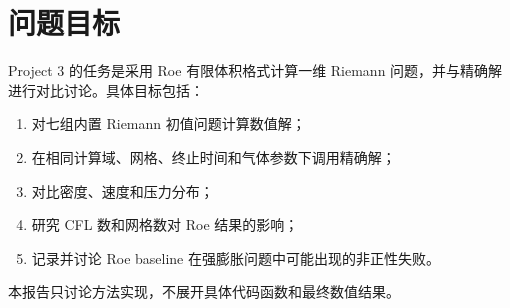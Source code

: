 \section{问题目标}

Project 3 的任务是采用 Roe 有限体积格式计算一维 Riemann 问题，并与精确解进行对比讨论。具体目标包括：

\begin{enumerate}[leftmargin=2em]
    \item 对七组内置 Riemann 初值问题计算数值解；
    \item 在相同计算域、网格、终止时间和气体参数下调用精确解；
    \item 对比密度、速度和压力分布；
    \item 研究 CFL 数和网格数对 Roe 结果的影响；
    \item 记录并讨论 Roe baseline 在强膨胀问题中可能出现的非正性失败。
\end{enumerate}

本报告只讨论方法实现，不展开具体代码函数和最终数值结果。
